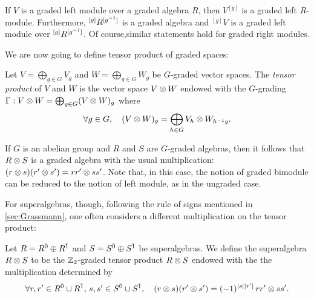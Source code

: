 If $V$ is a graded left module over a graded algebra $R$, then $V^{[g]}$ is a graded left $R$-module. 
Furthermore, ${}^{[g]} R ^{[g^{-1}]}$ is a graded algebra and ${}^{[g]}V$ is a graded left module over ${}^{[g]} R ^{[g^{-1}]}$. 
Of course,similar statements hold for graded right modules. 





We are now going to define tensor product of graded spaces:

\begin{defi}\label{defi:tensorProduct}
    Let $V=\bigoplus_{g\in G} V_g$ and $W=\bigoplus_{g\in G} W_g$ be $G$-graded vector spaces. 
    The \emph{tensor product} of $V$ and $W$ is the vector space $V \otimes W$ endowed with the $G$-grading $\Gamma : V \otimes W = \bigoplus_{g\in G} (V \otimes W)_g$ where
    \[
        \forall g\in G, \quad (V \otimes W)_g = \bigoplus_{h\in G} V_{h} \otimes W_{h^{-1} g}.
    \]
\end{defi}

\label{defi:tensor-algebras}

If $G$ is an abelian group and $R$ and $S$ are $G$-graded algebras, then it follows that $R \otimes S$ is a graded algebra with the usual multiplication: $(r \otimes s) (r' \otimes s') = rr' \otimes ss'$. 
Note that, in this case, the notion of graded bimodule can be reduced to the notion of left module, as in the ungraded case. 


For superalgebras, though, following the rule of signs mentioned in \cref{sec:Grassmann}, one often considers a different multiplication on the tensor product:

\begin{defi}\label{defi:tensorSuperalgebras}
    Let $R = R^{\bar0} \oplus R^{\bar1}$ and $S = S^{\bar0} \oplus S^{\bar1}$ be superalgebras. 
    We define the superalgebra $R \otimes S$ to be the $\mathbb{Z}_2$-graded tensor product $R \otimes S$ endowed with the the multiplication determined by
    \[
        \forall r, r' \in R^{\bar0} \cup R^{\bar1}, \, s,s' \in S^{\bar0} \cup S^{\bar1}, \quad 
        (r \otimes s) (r' \otimes s')
        = (-1)^{|s||r'|} \, rr' \otimes ss'.
    \]
\end{defi}

